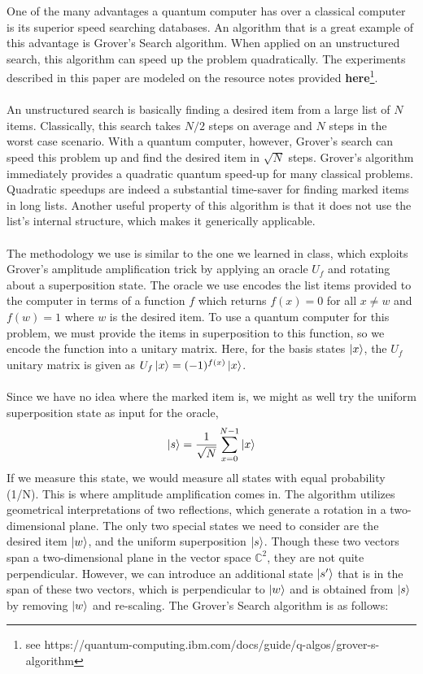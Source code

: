 \documentclass[12pt]{article}
\begin{document}
    One of the many advantages a quantum computer has over a classical computer is its superior speed searching databases. An algorithm that is a great example of this advantage is Grover’s Search algorithm. When applied on an unstructured search, this algorithm can speed up the problem quadratically. The experiments described in this paper are modeled on the resource notes provided \textbf{here}\footnote{see https://quantum-computing.ibm.com/docs/guide/q-algos/grover-s-algorithm}. 
    \\
    \smallskip
    \\
    An unstructured search is basically finding a desired item from a large list of $N$ items. Classically, this search takes $N/2$ steps on average and $N$ steps in the worst case scenario. With a quantum computer, however, Grover’s search can speed this problem up and find the desired item in $\sqrt{N}$ steps. Grover’s algorithm immediately provides a quadratic quantum speed-up for many classical problems. Quadratic speedups are indeed a substantial time-saver for finding marked items in long lists. Another useful property of this algorithm is that it does not use the list’s internal structure, which makes it generically applicable.
    \\
    \smallskip
    \\
    The methodology we use is similar to the one we learned in class, which exploits Grover’s amplitude amplification trick by applying an oracle $U_f$ and rotating about a superposition state. The oracle we use encodes the list items provided to the computer in terms of a function $f$ which returns $f(x) = 0$ for all $x \neq w$ and $f(w) = 1$ where $w$ is the desired item. To use a quantum computer for this problem, we must provide the items in superposition to this function, so we encode the function into a unitary matrix. Here, for the basis states $\ket{x}$, the $U_f$ unitary matrix is given as $U_f \ket{x} = (-1)^{f(x)} \ket{x}$.
    \\
    \smallskip
    \\
    Since we have no idea where the marked item is, we might as well try the uniform superposition state as input for the oracle, $$\ket{s} = \frac{1}{\sqrt{N}}\sum^{N-1}_{x=0}\ket{x}$$
    \noindent
    If we measure this state, we would measure all states with equal probability (1/N). This is where amplitude amplification comes in. The algorithm utilizes geometrical interpretations of two reflections, which generate a rotation in a two-dimensional plane. The only two special states we need to consider are the desired item $\ket{w}$,  and the uniform superposition $\ket{s}$. Though these two vectors span a two-dimensional plane in the vector space $\mathbb{C}^2$, they are not quite perpendicular. However, we can introduce an additional state $\ket{s^\prime}$  that is in the span of these two vectors, which is perpendicular to $\ket{w}$ and is obtained from $\ket{s}$ by removing $\ket{w}$ and re-scaling. The Grover’s Search algorithm is as follows:
    
\end{document}
